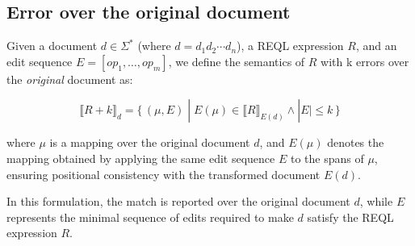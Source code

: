 \documentclass{article}
\newcommand{\ox}{x\!\vdash}
\newcommand{\cx}{\dashv\!x}
\newcommand{\doc}{\operatorname{doc}}
\begin{document}


\subsection{Error over the original document}


Given a document $d \in \Sigma^*$ (where $d = d_1d_2\cdots d_n$), a REQL expression $R$, and an edit sequence $E = [op_1, \ldots, op_m]$, we define the semantics of $R$ with k errors over the \emph{original} document as:

\[
\llbracket R + k \rrbracket_d = 
\{\, (\mu, E) \;|\;
E(\mu) \in \llbracket R \rrbracket_{E(d)} \land |E| \leq k
\,\}
\]

where $\mu$ is a mapping over the original document $d$, and $E(\mu)$ denotes the mapping obtained by applying the same edit sequence $E$ to the spans of $\mu$, ensuring positional consistency with the transformed document $E(d)$.

In this formulation, the match is reported over the original document $d$, while $E$ represents the minimal sequence of edits required to make $d$ satisfy the REQL expression $R$.




\end{document}

